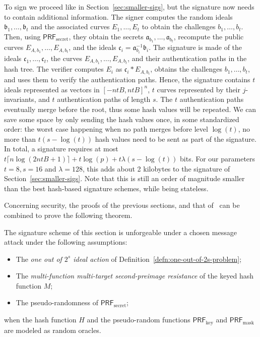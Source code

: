 \documentclass{llncs}
\renewcommand{\a}{\mathfrak{a}}
\renewcommand{\b}{\mathfrak{b}}
\renewcommand{\c}{\mathfrak{c}}
\newcommand{\PRF}{\textsf{PRF}}
\newcommand{\PRFk}{\PRF_{\mathrm{key}}}
\newcommand{\PRFm}{\PRF_{\mathrm{mask}}}
\newcommand{\PRFs}{\PRF_{\mathrm{secret}}}
\begin{document}
To sign we proceed like in Section~\ref{sec:smaller-sigs}, but the signature now needs to contain additional information.
The signer computes the random ideals $\b_1,\dots,\b_t$ and the associated curves $E_1,\dots,E_t$ to obtain the challenges $b_1,\dots,b_t$.
Then, using $\PRFs$, they obtain the secrets $\a_{b_1},\dots,\a_{b_t}$, recompute the public curves $E_{A,b_1},\dots,E_{A,b_t}$, and the ideals $\c_i=\a_{b_i}^{-1}\b_i$.
The signature is made of the ideals $\c_1,\dots,\c_t$, the curves $E_{A,b_1},\dots,E_{A,b_t}$, and their authentication paths in the hash tree.
The verifier computes $E_i$ as $\c_i * E_{A,b_i}$, obtains the challenges $b_1,\dots,b_t$, and uses them to verify the authentication paths.
Hence, the signature contains $t$ ideals represented as vectors in $[-ntB,ntB]^n$, $t$ curves represented by their $j$-invariants, and $t$ authentication paths of length $s$.
The $t$ authentication paths eventually merge before the root, thus some hash values will be repeated.
We can save some space by only sending the hash values once, in some standardized order: the worst case happening when no path merges before level $\log(t)$, no more than $t(s-\log(t))$ hash values need to be sent as part of the signature.
In total, a signature requires at most $t\lceil n \log(2ntB+1)\rceil + t\log(p) + t\lambda(s-\log(t))$ bits.
For our parameters $t=8, s=16$ and $\lambda=128$, this adds about 2 kilobytes to the signature of Section~\ref{sec:smaller-sigs}.
Note that this is still an order of magnitude smaller than the best hash-based signature schemes, while being stateless.

Concerning security, the proofs of the previous sections, and that of~\cite[Appendix~B]{10.1007/978-3-662-49384-7_15} can be combined to prove the following theorem.

\begin{theorem}
  The signature scheme of this section is unforgeable under a chosen
  message attack under the following assumptions:
  \begin{itemize}
  \item The \emph{one out of $2^s$ ideal action} of Definition~\ref{defn:one-out-of-2s-problem};
  \item The \emph{multi-function multi-target second-preimage resistance} of
    the keyed hash function $M$;
  \item The pseudo-randomness of $\PRFs$;
  \end{itemize}
  when the hash function $H$ and the pseudo-random functions $\PRFk$
  and $\PRFm$ are modeled as random oracles.
\end{theorem}
\end{document}
